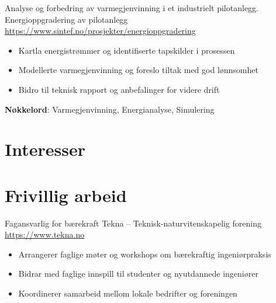 \documentclass[a4paper, serif, 10pt]{moderncv}
\begin{document}
        {Analyse og forbedring av varmegjenvinning i et industrielt pilotanlegg.}
        {Energioppgradering av pilotanlegg}
        {\url{https://www.sintef.no/prosjekter/energioppgradering}}
        {}
        {\begin{itemize}
\item Kartla energistrømmer og identifiserte tapskilder i prosessen
\item Modellerte varmegjenvinning og foreslo tiltak med god lønnsomhet
\item Bidro til teknisk rapport og anbefalinger for videre drift
\end{itemize}
\textbf{Nøkkelord}: Varmegjenvinning, Energianalyse, Simulering}
\section{Interesser}

\section{Frivillig arbeid}

        {Fagansvarlig for bærekraft}
        {Tekna – Teknisk-naturvitenskapelig forening}
        {\url{https://www.tekna.no}}
        {}
        {\begin{itemize}
\item Arrangerer faglige møter og workshops om bærekraftig ingeniørpraksis
\item Bidrar med faglige innspill til studenter og nyutdannede ingeniører
\item Koordinerer samarbeid mellom lokale bedrifter og foreningen
\end{itemize}}
    
\end{document}
